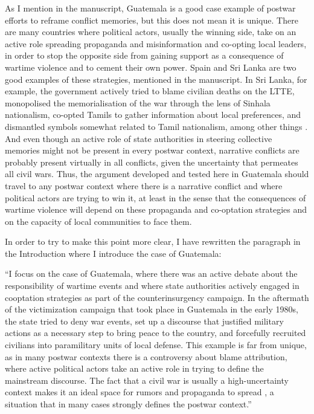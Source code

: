 \documentclass[12pt, a4paper, notitlepage]{article}
\begin{document}
As I mention in the manuscript, Guatemala is a good case example of postwar efforts to reframe conflict memories, but this does not mean it is unique. There are many countries where political actors, usually the winning side, take on an active role spreading propaganda and misinformation and co-opting local leaders, in order to stop the opposite side from gaining support as a consequence of wartime violence and to cement their own power. Spain and Sri Lanka are two good examples of these strategies, mentioned in the manuscript. In Sri Lanka, for example, the government actively tried to blame civilian deaths on the LTTE, monopolised the memorialisation of the war through the lens of Sinhala nationalism, co-opted Tamils to gather information about local preferences, and dismantled symbols somewhat related to Tamil nationalism, among other things \citep{Subramanian:2016vk, Seoighe:2017aa, Kapur:2020we}.
And even though an active role of state authorities in steering collective memories might not be present in every postwar context, narrative conflicts are probably present virtually in all conflicts, given the uncertainty that permeates all civil wars.
Thus, the argument developed and tested here in Guatemala should travel to any postwar context where there is a narrative conflict and where political actors are trying to win it, at least in the sense that the consequences of wartime violence will depend on these propaganda and co-optation strategies and on the capacity of local communities to face them.

In order to try to make this point more clear, I have rewritten the paragraph in the Introduction where I introduce the case of Guatemala:

``I focus on the case of Guatemala, where there was an active debate about the responsibility of wartime events and where state authorities actively engaged in cooptation strategies as part of the counterinsurgency campaign.
In the aftermath of the victimization campaign that took place in Guatemala in the early 1980s, the state tried to deny war events, set up a discourse that justified military actions as a necessary step to bring peace to the country, and forcefully recruited civilians into paramilitary units of local defense.
This example is far from unique, as in many postwar contexts there is a controversy about blame attribution, where active political actors take an active role in trying to define the mainstream discourse.
The fact that a civil war is usually a high-uncertainty context makes it an ideal space for rumors and propaganda to spread \citep{Schon:2021wf}, a situation that in many cases strongly defines the postwar context.''
\end{document}
